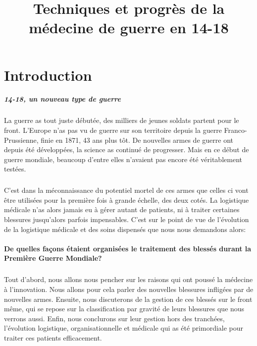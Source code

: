 \documentclass[a4paper, BCOR=0mm, fontsize=12pt, titlepage=firstiscover]{scrreprt}
\title{Techniques et progrès de la médecine de guerre en 14-18}
\date{}
\begin{document}
	
	
	\maketitle
	
	\tableofcontents

	
	
	\chapter{Introduction}
	\paragraph{14-18, un nouveau type de guerre} %
	La guerre as tout juste débutée, des milliers de jeunes soldats partent pour le front.
	L'Europe n'as pas vu de guerre sur son territoire depuis la guerre Franco-Prussienne, finie en 1871, 43 ans plus tôt.
	De nouvelles armes de guerre ont depuis été développées, la science as continué de progresser.
	Mais en ce début de guerre mondiale, beaucoup d'entre elles n'avaient pas encore été véritablement testées.
	
	\paragraph{} 
	C'est dans la méconnaissance du potentiel mortel de ces armes que celles ci vont être utilisées pour la première fois à grande échelle, des deux cotés.
	La logistique médicale n'as alors jamais eu à gérer autant de patients, ni à traiter certaines blessures jusqu'alors parfois impensables.
	C'est sur le point de vue de l'évolution de la logistique médicale et des soins dispensés que nous nous demandons alors:
	\\\\
	
	{\centering \large \textbf{De quelles façons étaient organisées le traitement des blessés durant la Première Guerre Mondiale?}}
	\\
	\paragraph{}
	Tout d'abord, nous allons nous pencher sur les raisons qui ont poussé la médecine à l'innovation.
	Nous allons pour cela parler des nouvelles blessures infligées par de nouvelles armes.
	Ensuite, nous discuterons de la gestion de ces blessés sur le front même, qui se repose sur la classification par gravité de leurs blessures que nous verrons aussi.
	Enfin, nous conclurons sur leur gestion hors des tranchées, l'évolution logistique, organisationnelle et médicale qui as été primordiale pour traiter ces patients efficacement.
	
\end{document}
